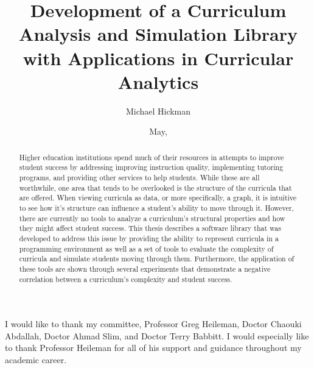 \documentclass[botnum, fleqn]{unmeethesis}
\begin{document}
\frontmatter

\title{Development of a Curriculum Analysis and Simulation Library with Applications in Curricular Analytics}
\author{Michael Hickman}
\date{May, \thisyear}

\maketitle
\makecopyright




\begin{acknowledgments}
  \vspace{1.1in}
  I would like to thank my committee, Professor Greg Heileman, Doctor Chaouki Abdallah, Doctor Ahmad Slim, and Doctor Terry Babbitt. I would especially like to thank Professor Heileman for all of his support and guidance throughout my academic career.
\end{acknowledgments}


\maketitleabstract

\begin{abstract}
  Higher education institutions spend much of their resources in attempts to improve student success by addressing improving instruction quality, implementing tutoring programs, and providing other services to help students. While these are all worthwhile, one area that tends to be overlooked is the structure of the curricula that are offered. When viewing curricula as data, or more specifically, a graph, it is intuitive to see how it's structure can influence a student's ability to move through it. However, there are currently no tools to analyze a curriculum's structural properties and how they might affect student success. This thesis describes a software library that was developed to address this issue by providing the ability to represent curricula in a programming environment as well as a set of tools to evaluate the complexity of curricula and simulate students moving through them. Furthermore, the application of these tools are shown through several experiments that demonstrate a negative correlation between a curriculum's complexity and student success.

  \clearpage
\end{abstract}
\end{document}
